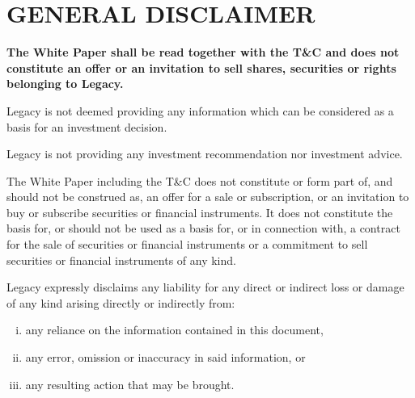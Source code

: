 \chapter*{GENERAL DISCLAIMER} %
\label{cha:general_disclaimer}


\textbf{The White Paper shall be read together with the T\&C and does not constitute an offer or an invitation to sell shares, securities or rights belonging to Legacy.}
\vspace{2mm}

Legacy is not deemed providing any information which can be considered as a basis for an investment decision.
\vspace{2mm}

Legacy is not providing any investment recommendation nor investment advice.
\vspace{2mm}

The White Paper including the T\&C does not constitute or form part of, and should not be construed as, an offer for a sale or subscription, or an invitation to buy or subscribe securities or financial instruments. It does not constitute the basis for, or should not be used as a basis for, or in connection with, a contract for the sale of securities or financial instruments or a commitment to sell securities or financial instruments of any kind.
\vspace{2mm}

Legacy expressly disclaims any liability for any direct or indirect loss or damage of any kind arising directly or indirectly from:
\begin{enumerate}[i.]
	\item any reliance on the information contained in this document,
	\item any error, omission or inaccuracy in said information, or
	\item any resulting action that may be brought.
\end{enumerate}


